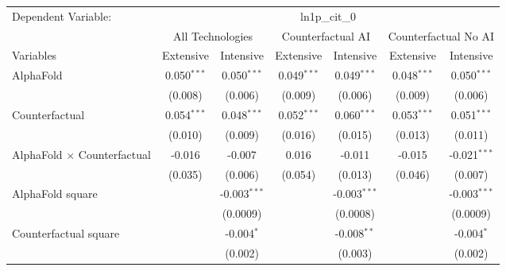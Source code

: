 \begingroup
\centering
\begin{tabular}{lcccccc}
   \tabularnewline \midrule \midrule
   Dependent Variable: & \multicolumn{6}{c}{ln1p\_cit\_0}\\
 & \multicolumn{2}{c}{All Technologies} & \multicolumn{2}{c}{Counterfactual AI} & \multicolumn{2}{c}{Counterfactual No AI} \\
\cmidrule(lr){1-1}\cmidrule(lr){2-3} \cmidrule(lr){4-5} \cmidrule(lr){6-7}
Variables & \multicolumn{1}{c}{Extensive} & \multicolumn{1}{c}{Intensive} & \multicolumn{1}{c}{Extensive} & \multicolumn{1}{c}{Intensive} & \multicolumn{1}{c}{Extensive} & \multicolumn{1}{c}{Intensive} \\
\cmidrule(lr){1-1}\cmidrule(lr){2-2} \cmidrule(lr){3-3} \cmidrule(lr){4-4} \cmidrule(lr){5-5} \cmidrule(lr){6-6} \cmidrule(lr){7-7}
   AlphaFold                          & 0.050$^{***}$ & 0.050$^{***}$  & 0.049$^{***}$ & 0.049$^{***}$  & 0.048$^{***}$ & 0.050$^{***}$\\   
                                      & (0.008)       & (0.006)        & (0.009)       & (0.006)        & (0.009)       & (0.006)\\   
   Counterfactual                     & 0.054$^{***}$ & 0.048$^{***}$  & 0.052$^{***}$ & 0.060$^{***}$  & 0.053$^{***}$ & 0.051$^{***}$\\   
                                      & (0.010)       & (0.009)        & (0.016)       & (0.015)        & (0.013)       & (0.011)\\   
   AlphaFold $\times$ Counterfactual  & -0.016        & -0.007         & 0.016         & -0.011         & -0.015        & -0.021$^{***}$\\   
                                      & (0.035)       & (0.006)        & (0.054)       & (0.013)        & (0.046)       & (0.007)\\   
   AlphaFold square                   &               & -0.003$^{***}$ &               & -0.003$^{***}$ &               & -0.003$^{***}$\\   
                                      &               & (0.0009)       &               & (0.0008)       &               & (0.0009)\\   
   Counterfactual square              &               & -0.004$^{*}$   &               & -0.008$^{**}$  &               & -0.004$^{*}$\\   
                                      &               & (0.002)        &               & (0.003)        &               & (0.002)\\   

\end{tabular}
